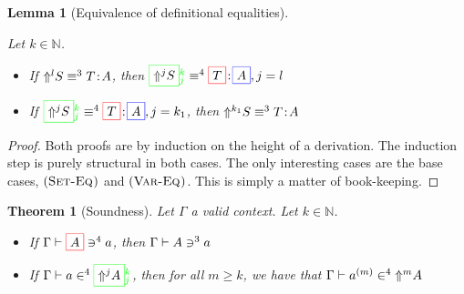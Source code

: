 \documentclass[preprint
              , authoryear
              , onecolumn
              ]{sigplanconf}
\newtheorem{theorem}{Theorem}
\newtheorem{lemma}{Lemma}
\newcommand{\redb}[1]{\fcolorbox{red}{white}{$#1$}}
\newcommand{\blueb}[1]{\fcolorbox{blue}{white}{$#1$}}
\newcommand{\greenb}[3]{\fcolorbox{green}{white}{$#1$}_{\textcolor{green}{#2}}^{\textcolor{green}{#3}}}
\newcommand{\ruleName}[2]{(\mathrm{\textsc{#1}}^{#2})}
\newcommand{\ruleSetEq}[1]{\ruleName{Set-Eq}{#1}}
\newcommand{\ruleVarEq}[1]{\ruleName{Var-Eq}{#1}}
\newcommand{\N}{\mathbb{N}}
\begin{document}

\begin{lemma}[Equivalence of definitional equalities]
\label{lemma:equiv-def-eq-3-4}

Let $k \in \N$.

\begin{itemize}
\item If \xspace$\equalN{\Up{l}{S}}{T}{3}{A}$, then
      $\equalN{\greenb{\Up{j}{S}}{j}{k}}{\redb{T}}{4}{\blueb{A}},j=l$
\item If \xspace$\equalN{\greenb{\Up{j}{S}}{j}{k}}{\redb{T}}{4}{\blueb{A}},j=k_1$,
      then $\equalN{\Up{k_1}{S}}{T}{3}{A}$
\end{itemize}

\end{lemma}


\begin{proof}

Both proofs are by induction on the height of a derivation. The
induction step is purely structural in both cases. The only
interesting cases are the base cases, $\ruleSetEq{}$ and
$\ruleVarEq{}$. This is simply a matter of book-keeping.

\end{proof}


\begin{theorem}[Soundness]

Let $\Gamma$ a valid context. Let $k \in \N$.

\begin{itemize}
\item If \xspace$\Gamma \vdash \pushN{a}{4}{\redb{A}}$, then 
      $\Gamma \vdash \pushN{a}{3}{A}$
\item If \xspace$\Gamma \vdash \pullN{a}{4}{\greenb{\Up{j}{A}}{j}{k}}$, then for all
      $m \geq k$, we have that $\Gamma \vdash \pullN{a^{(m)}}{4}{\Up{m}{A}}$
\end{itemize}

\end{theorem}

\end{document}
